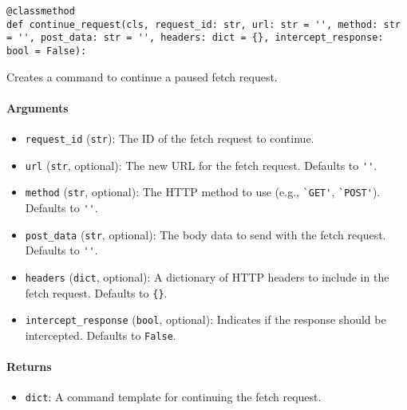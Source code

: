 \documentclass{article}
\begin{document}
\begin{lstlisting}[style=pythonstyle]
@classmethod
def continue_request(cls, request_id: str, url: str = '', method: str = '', post_data: str = '', headers: dict = {}, intercept_response: bool = False):
\end{lstlisting}

\noindent Creates a command to continue a paused fetch request.

\paragraph{Arguments}

\begin{itemize}
    \item \lstinline[style=pythonstyle]|request_id| (\lstinline[style=pythonstyle]|str|): The ID of the fetch request to continue.
    \item \lstinline[style=pythonstyle]|url| (\lstinline[style=pythonstyle]|str|, optional): The new URL for the fetch request. Defaults to \lstinline[style=pythonstyle]|''|.
    \item \lstinline[style=pythonstyle]|method| (\lstinline[style=pythonstyle]|str|, optional): The HTTP method to use (e.g., \lstinline[style=pythonstyle]|`GET'|, \lstinline[style=pythonstyle]|`POST'|). Defaults to \lstinline[style=pythonstyle]|''|.
    \item \lstinline[style=pythonstyle]|post_data| (\lstinline[style=pythonstyle]|str|, optional): The body data to send with the fetch request. Defaults to \lstinline[style=pythonstyle]|''|.
    \item \lstinline[style=pythonstyle]|headers| (\lstinline[style=pythonstyle]|dict|, optional): A dictionary of HTTP headers to include in the fetch request. Defaults to \lstinline[style=pythonstyle]|{}|.
    \item \lstinline[style=pythonstyle]|intercept_response| (\lstinline[style=pythonstyle]|bool|, optional): Indicates if the response should be intercepted. Defaults to \lstinline[style=pythonstyle]|False|.
\end{itemize}

\paragraph{Returns}

\begin{itemize}
    \item \lstinline[style=pythonstyle]|dict|: A command template for continuing the fetch request.
\end{itemize}
\end{document}
